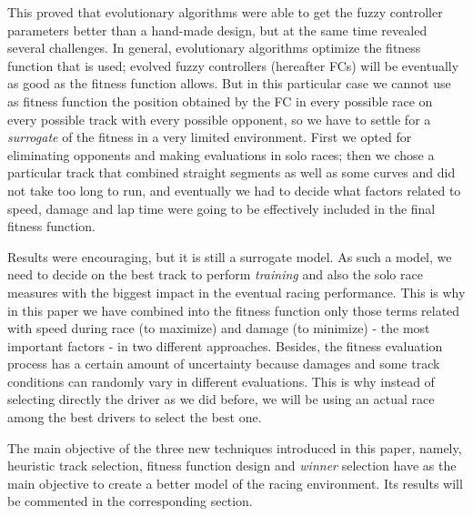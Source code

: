 \documentclass[conference]{IEEEtran}
\begin{document}
This proved that evolutionary algorithms were able to get the fuzzy
controller parameters better than a hand-made design, but at the same
time revealed several challenges. In general, evolutionary algorithms
optimize the fitness function that is used; evolved fuzzy controllers
(hereafter FCs) will be eventually as good as the fitness function allows. 
But in this particular case we cannot use as fitness function the position
obtained by the FC in every possible race on every possible track with
every possible opponent, so we have to settle for a {\em surrogate} of
the fitness in a very limited environment. First we opted for
eliminating opponents and making evaluations in solo races; then we
chose a particular track that combined straight segments as well as
some curves and did not take too long to run, and eventually we had to
decide what factors related to speed, damage and lap time were going
to be effectively included in the final fitness function. 

Results were encouraging, but it is still a surrogate model. As such a
model, we need to decide on the best track to perform {\em training}
and also the solo race measures with the biggest impact in the
eventual racing performance. This is why in this paper we have
combined into the fitness function only those terms related with speed during race (to maximize) and damage (to minimize) - the most important factors - in two different approaches.
Besides, the fitness evaluation process has a certain amount of uncertainty because damages and some track conditions can randomly vary in different
evaluations. This is why instead of selecting directly the driver as
we did before, we will be using an actual race among the best drivers
to select the best one.

The main objective of the three new techniques introduced in this
paper, namely, heuristic track selection, fitness function design and
{\em winner} selection have as the main objective to create a better
model of the racing environment. Its results will be commented in the
corresponding section. 



\end{document}

